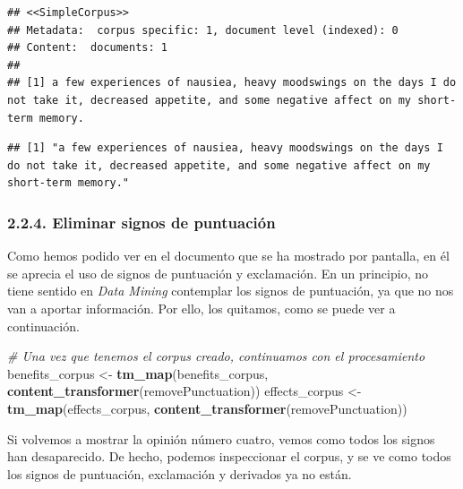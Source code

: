 \documentclass[spanish,]{article}
\newenvironment{Shaded}{\begin{snugshade}}{\end{snugshade}}
\newcommand{\CommentTok}[1]{\textcolor[rgb]{0.56,0.35,0.01}{\textit{#1}}}
\newcommand{\DecValTok}[1]{\textcolor[rgb]{0.00,0.00,0.81}{#1}}
\newcommand{\KeywordTok}[1]{\textcolor[rgb]{0.13,0.29,0.53}{\textbf{#1}}}
\newcommand{\NormalTok}[1]{#1}
\newcommand{\OperatorTok}[1]{\textcolor[rgb]{0.81,0.36,0.00}{\textbf{#1}}}
\newcommand{\StringTok}[1]{\textcolor[rgb]{0.31,0.60,0.02}{#1}}
\begin{document}
\begin{verbatim}
## <<SimpleCorpus>>
## Metadata:  corpus specific: 1, document level (indexed): 0
## Content:  documents: 1
## 
## [1] a few experiences of nausiea, heavy moodswings on the days I do not take it, decreased appetite, and some negative affect on my short-term memory.
\end{verbatim}

\begin{Shaded}
\end{Shaded}

\begin{verbatim}
## [1] "a few experiences of nausiea, heavy moodswings on the days I do not take it, decreased appetite, and some negative affect on my short-term memory."
\end{verbatim}

\hypertarget{eliminar-signos-de-puntuacion}{%
\subsubsection{2.2.4. Eliminar signos de
puntuación}\label{eliminar-signos-de-puntuacion}}

Como hemos podido ver en el documento que se ha mostrado por pantalla,
en él se aprecia el uso de signos de puntuación y exclamación. En un
principio, no tiene sentido en \textit{Data Mining} contemplar los
signos de puntuación, ya que no nos van a aportar información. Por ello,
los quitamos, como se puede ver a continuación.

\begin{Shaded}
\begin{Highlighting}[]
\CommentTok{# Una vez que tenemos el corpus creado, continuamos con el procesamiento}
\NormalTok{benefits_corpus <-}\StringTok{ }\KeywordTok{tm_map}\NormalTok{(benefits_corpus, }\KeywordTok{content_transformer}\NormalTok{(removePunctuation))}
\NormalTok{effects_corpus <-}\StringTok{ }\KeywordTok{tm_map}\NormalTok{(effects_corpus, }\KeywordTok{content_transformer}\NormalTok{(removePunctuation))}
\end{Highlighting}
\end{Shaded}

Si volvemos a mostrar la opinión número cuatro, vemos como todos los
signos han desaparecido. De hecho, podemos inspeccionar el corpus, y se
ve como todos los signos de puntuación, exclamación y derivados ya no
están.
\end{document}
